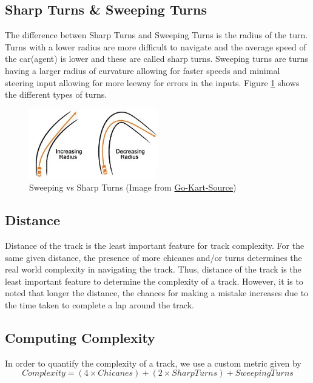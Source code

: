 \subsection{Sharp Turns \& Sweeping Turns}
The difference betwen Sharp Turns and Sweeping Turns is the radius of the turn. Turns with a lower radius are more difficult to navigate and the average speed of the car(agent) is lower and these are called sharp turns. Sweeping turns are turns having a larger radius of curvature allowing for faster speeds and minimal steering input allowing for more leeway for errors in the inputs. Figure \ref{fig:turns} shows the different types of turns.

\begin{figure}[H]
    \centering
    \includegraphics[width=0.5\textwidth]{images/Turn-Types-crop.jpg}
    \caption{Sweeping vs Sharp Turns (Image from \href{https://go-kart-source.com/go-kart-cornering/}{Go-Kart-Source})}
    \label{fig:turns}
\end{figure}

\subsection{Distance}
Distance of the track is the least important feature for track complexity. For the same given distance, the presence of more chicanes and/or turns determines the real world complexity in navigating the track. Thus, distance of the track is the least important feature to determine the complexity of a track. However, it is to noted that longer the distance, the chances for making a mistake increases due to the time taken to complete a lap around the track.

\subsection{Computing Complexity}
In order to quantify the complexity of a track, we use a custom metric given by
\begin{equation}
    Complexity = (4 \times Chicanes) + (2 \times SharpTurns) + SweepingTurns     
\end{equation}

